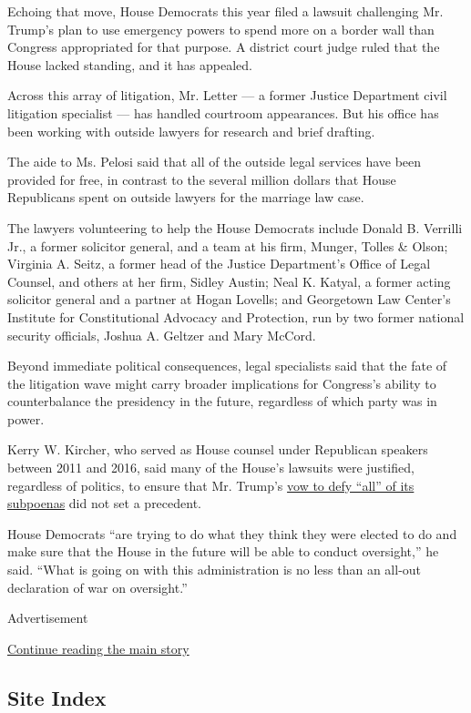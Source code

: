 Echoing that move, House Democrats this year filed a lawsuit challenging
Mr. Trump's plan to use emergency powers to spend more on a border wall
than Congress appropriated for that purpose. A district court judge
ruled that the House lacked standing, and it has appealed.

Across this array of litigation, Mr. Letter --- a former Justice
Department civil litigation specialist --- has handled courtroom
appearances. But his office has been working with outside lawyers for
research and brief drafting.

The aide to Ms. Pelosi said that all of the outside legal services have
been provided for free, in contrast to the several million dollars that
House Republicans spent on outside lawyers for the marriage law case.

The lawyers volunteering to help the House Democrats include Donald B.
Verrilli Jr., a former solicitor general, and a team at his firm,
Munger, Tolles \& Olson; Virginia A. Seitz, a former head of the Justice
Department's Office of Legal Counsel, and others at her firm, Sidley
Austin; Neal K. Katyal, a former acting solicitor general and a partner
at Hogan Lovells; and Georgetown Law Center's Institute for
Constitutional Advocacy and Protection, run by two former national
security officials, Joshua A. Geltzer and Mary McCord.

Beyond immediate political consequences, legal specialists said that the
fate of the litigation wave might carry broader implications for
Congress's ability to counterbalance the presidency in the future,
regardless of which party was in power.

Kerry W. Kircher, who served as House counsel under Republican speakers
between 2011 and 2016, said many of the House's lawsuits were justified,
regardless of politics, to ensure that Mr. Trump's
\href{https://www.nytimes3xbfgragh.onion/2019/04/24/us/politics/donald-trump-subpoenas.html}{vow
to defy ``all'' of its subpoenas} did not set a precedent.

House Democrats ``are trying to do what they think they were elected to
do and make sure that the House in the future will be able to conduct
oversight,'' he said. ``What is going on with this administration is no
less than an all-out declaration of war on oversight.''

Advertisement

\protect\hyperlink{after-bottom}{Continue reading the main story}

\hypertarget{site-index}{%
\subsection{Site Index}\label{site-index}}

